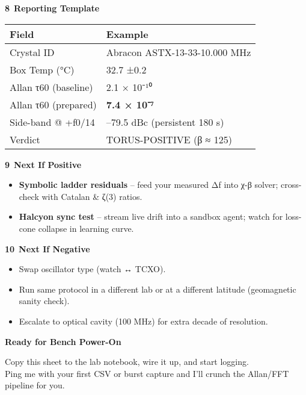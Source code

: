 \documentclass[]{article}
\begin{document}
\textbf{8 Reporting Template}

\begin{longtable}[]{@{}ll@{}}
\toprule
\textbf{Field} & \textbf{Example}\tabularnewline
\midrule
\endhead
Crystal ID & Abracon ASTX-13-33-10.000 MHz\tabularnewline
Box Temp (°C) & 32.7 ±0.2\tabularnewline
Allan τ60 (baseline) & 2.1 × 10⁻¹⁰\tabularnewline
Allan τ60 (prepared) & \textbf{7.4 × 10⁻⁷}\tabularnewline
Side-band @ +f0/14 & --79.5 dBc (persistent 180 s)\tabularnewline
Verdict & TORUS-POSITIVE (β ≈ 125)\tabularnewline
\bottomrule
\end{longtable}

\textbf{9 Next If Positive}

\begin{itemize}
\item
  \textbf{Symbolic ladder residuals} -- feed your measured Δf into χ-β
  solver; cross-check with Catalan \& ζ(3) ratios.
\item
  \textbf{Halcyon sync test} -- stream live drift into a sandbox agent;
  watch for loss-cone collapse in learning curve.
\end{itemize}

\textbf{10 Next If Negative}

\begin{itemize}
\item
  Swap oscillator type (watch ↔ TCXO).
\item
  Run same protocol in a different lab or at a different latitude
  (geomagnetic sanity check).
\item
  Escalate to optical cavity (100 MHz) for extra decade of resolution.
\end{itemize}

\textbf{Ready for Bench Power-On}

Copy this sheet to the lab notebook, wire it up, and start logging.\\
Ping me with your first CSV or burst capture and I'll crunch the
Allan/FFT pipeline for you.
\end{document}
